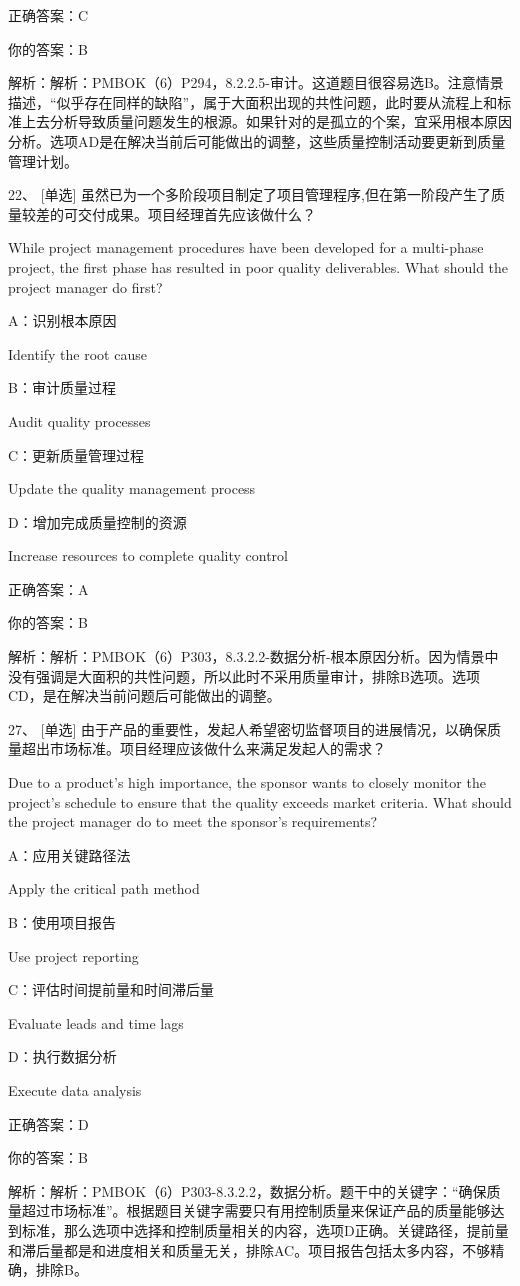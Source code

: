正确答案：C

你的答案：B

解析：解析：PMBOK（6）P294，8.2.2.5-审计。这道题目很容易选B。注意情景描述，“似乎存在同样的缺陷”，属于大面积出现的共性问题，此时要从流程上和标准上去分析导致质量问题发生的根源。如果针对的是孤立的个案，宜采用根本原因分析。选项AD是在解决当前后可能做出的调整，这些质量控制活动要更新到质量管理计划。


22、 [单选] 虽然已为一个多阶段项目制定了项目管理程序,但在第一阶段产生了质量较差的可交付成果。项目经理首先应该做什么？

While project management procedures have been developed for a multi-phase project, the first phase has resulted in poor quality deliverables. What should the project manager do first?

A：识别根本原因

Identify the root cause

B：审计质量过程

Audit quality processes

C：更新质量管理过程

Update the quality management process

D：增加完成质量控制的资源

Increase resources to complete quality control

正确答案：A

你的答案：B

解析：解析：PMBOK（6）P303，8.3.2.2-数据分析-根本原因分析。因为情景中没有强调是大面积的共性问题，所以此时不采用质量审计，排除B选项。选项CD，是在解决当前问题后可能做出的调整。


27、 [单选] 由于产品的重要性，发起人希望密切监督项目的进展情况，以确保质量超出市场标准。项目经理应该做什么来满足发起人的需求？

Due to a product’s high importance, the sponsor wants to closely monitor the project's schedule to ensure that the quality exceeds market criteria. What should the project manager do to meet the sponsor’s requirements?

A：应用关键路径法

Apply the critical path method

B：使用项目报告

Use project reporting

C：评估时间提前量和时间滞后量

Evaluate leads and time lags

D：执行数据分析

Execute data analysis

正确答案：D

你的答案：B

解析：解析：PMBOK（6）P303-8.3.2.2，数据分析。题干中的关键字：“确保质量超过市场标准”。根据题目关键字需要只有用控制质量来保证产品的质量能够达到标准，那么选项中选择和控制质量相关的内容，选项D正确。关键路径，提前量和滞后量都是和进度相关和质量无关，排除AC。项目报告包括太多内容，不够精确，排除B。

